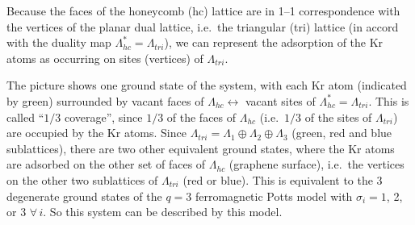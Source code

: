 Because the faces of the honeycomb (hc) lattice are in 1--1 correspondence with the vertices of the planar dual lattice,
i.e.\ the triangular (tri) lattice (in accord with the duality map $\Lambda_{hc}^* = \Lambda_{tri}$), we can represent the
adsorption of the Kr atoms as occurring on sites (vertices) of $\Lambda_{tri}$.

\begin{diagram}
\label{fig:kr}
\end{diagram}

The picture shows one ground state of the system, with each Kr atom (indicated by green) surrounded by vacant faces of
$\Lambda_{hc}\leftrightarrow$ vacant sites of $\Lambda_{hc}^* = \Lambda_{tri}$. This is called ``$1/3$ coverage'', since
$1/3$ of the faces of $\Lambda_{hc}$ (i.e.\ $1/3$ of the sites of $\Lambda_{tri}$) are occupied by the Kr atoms. Since
$\Lambda_{tri} = \Lambda_1\oplus\Lambda_2\oplus\Lambda_3$ (green, red and blue sublattices), there are two other equivalent
ground states, where the Kr atoms are adsorbed on the other set of faces of $\Lambda_{hc}$ (graphene surface), i.e.\ the
vertices on the other two sublattices of $\Lambda_{tri}$ (red or blue). This is equivalent to the 3 degenerate ground states
of the $q = 3$ ferromagnetic Potts model with $\sigma_i = 1$, 2, or 3 $\forall\,i$. So this system can be described by this
model.
